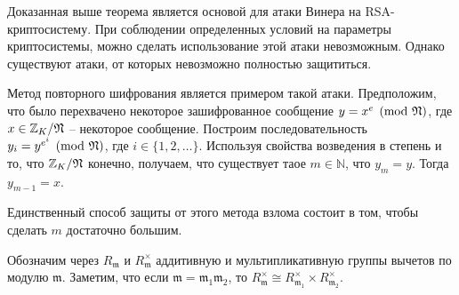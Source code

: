 \documentclass[_00_dissertation.tex]{subfiles}
\begin{document}
\begin{remark}
    Доказанная выше теорема является основой для атаки Винера на RSA-криптосистему.
    При соблюдении определенных условий на параметры криптосистемы, можно сделать использование этой атаки невозможным.
    Однако существуют атаки, от которых невозможно полностью защититься.
    
    Метод повторного шифрования является примером такой атаки.
    Предположим, что было перехвачено некоторое зашифрованное сообщение $y = x^e \pmod{\mathfrak{N}}$, где $x \in \mathbb{Z}_{K} / \mathfrak{N}$ -- некоторое сообщение.
    Построим последовательность $y_i = y^{e^i} \pmod{\mathfrak{N}}$, где $i \in \{1, 2, \ldots\}$.
    Используя свойства возведения в степень и то, что $\mathbb{Z}_{K} / \mathfrak{N}$ конечно, получаем, что существует таое $m \in \mathbb{N}$, что $y_m = y$.
    Тогда $y_{m-1} = x$.
    
    Единственный способ защиты от этого метода взлома состоит в том, чтобы сделать $m$ достаточно большим.
\end{remark}

Обозначим через $R_{\mathfrak{m}}$ и $R_{\mathfrak{m}}^{\times}$ аддитивную и мультипликативную группы вычетов по модулю $\mathfrak{m}$.
Заметим, что если $\mathfrak{m}=\mathfrak{m}_1 \mathfrak{m}_2$, то $R_{\mathfrak{m}}^{\times} \cong R_{\mathfrak{m}_1}^{\times} \times R_{\mathfrak{m}_2}^{\times}$.
\end{document}
